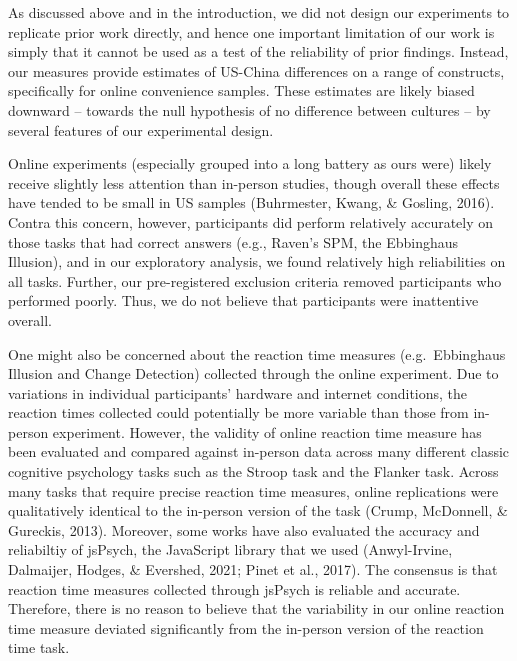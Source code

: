 \documentclass[
  man,floatsintext]{apa6}
\begin{document}
As discussed above and in the introduction, we did not design our experiments to replicate prior work directly, and hence one important limitation of our work is simply that it cannot be used as a test of the reliability of prior findings. Instead, our measures provide estimates of US-China differences on a range of constructs, specifically for online convenience samples. These estimates are likely biased downward -- towards the null hypothesis of no difference between cultures -- by several features of our experimental design.

Online experiments (especially grouped into a long battery as ours were) likely receive slightly less attention than in-person studies, though overall these effects have tended to be small in US samples (Buhrmester, Kwang, \& Gosling, 2016). Contra this concern, however, participants did perform relatively accurately on those tasks that had correct answers (e.g., Raven's SPM, the Ebbinghaus Illusion), and in our exploratory analysis, we found relatively high reliabilities on all tasks. Further, our pre-registered exclusion criteria removed participants who performed poorly. Thus, we do not believe that participants were inattentive overall.

One might also be concerned about the reaction time measures (e.g.~Ebbinghaus Illusion and Change Detection) collected through the online experiment. Due to variations in individual participants' hardware and internet conditions, the reaction times collected could potentially be more variable than those from in-person experiment. However, the validity of online reaction time measure has been evaluated and compared against in-person data across many different classic cognitive psychology tasks such as the Stroop task and the Flanker task. Across many tasks that require precise reaction time measures, online replications were qualitatively identical to the in-person version of the task (Crump, McDonnell, \& Gureckis, 2013). Moreover, some works have also evaluated the accuracy and reliabiltiy of jsPsych, the JavaScript library that we used (Anwyl-Irvine, Dalmaijer, Hodges, \& Evershed, 2021; Pinet et al., 2017). The consensus is that reaction time measures collected through jsPsych is reliable and accurate. Therefore, there is no reason to believe that the variability in our online reaction time measure deviated significantly from the in-person version of the reaction time task.
\end{document}
